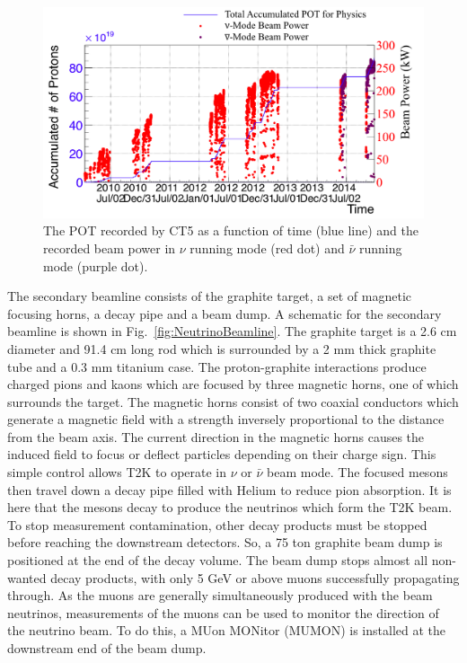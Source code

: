 \begin{figure}
  \centering
  \includegraphics[width=15cm]{images/t2k/pot_history.png}
  \caption{The POT recorded by CT5 as a function of time (blue line) and the recorded beam power in $\nu$ running mode (red dot) and $\bar{\nu}$ running mode (purple dot).}
  \label{fig:POTHistory}
\end{figure}
\newline
The secondary beamline consists of the graphite target, a set of magnetic focusing horns, a decay pipe and a beam dump.  A schematic for the secondary beamline is shown in Fig.~\ref{fig:NeutrinoBeamline}.  The graphite target is a 2.6 cm diameter and 91.4 cm long rod which is surrounded by a 2 mm thick graphite tube and a 0.3 mm titanium case.  The proton-graphite interactions produce charged pions and kaons which are focused by three magnetic horns, one of which surrounds the target.  The magnetic horns consist of two coaxial conductors which generate a magnetic field with a strength inversely proportional to the distance from the beam axis.  The current direction in the magnetic horns causes the induced field to focus or deflect particles depending on their charge sign.  This simple control allows T2K to operate in $\nu$ or $\bar{\nu}$ beam mode.  The focused mesons then travel down a decay pipe filled with Helium to reduce pion absorption.  It is here that the mesons decay to produce the neutrinos which form the T2K beam.  To stop measurement contamination, other decay products must be stopped before reaching the downstream detectors.  So, a 75 ton graphite beam dump is positioned at the end of the decay volume.  The beam dump stops almost all non-wanted decay products, with only 5 GeV or above muons successfully propagating through.  As the muons are generally simultaneously produced with the beam neutrinos, measurements of the muons can be used to monitor the direction of the neutrino beam.  To do this, a MUon MONitor (MUMON) is installed at the downstream end of the beam dump.

